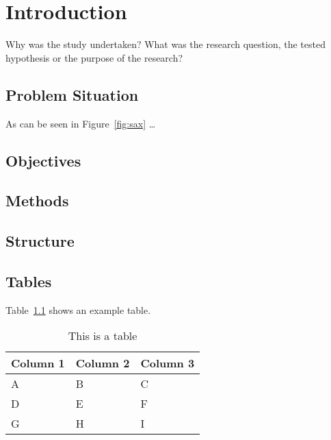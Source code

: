 \chapter{Introduction}

Why was the study undertaken? What was the research question, the tested hypothesis or the purpose of the research?

\blindtext \citet{Shearer2000}

\section{Problem Situation}

\blindtext


As can be seen in Figure~\ref{fig:sax} \ldots

\section{Objectives}

\blindtext

\section{Methods}

\blindtext

\section{Structure}

\blindtext

\section{Tables}

Table~\ref{tab:table-one} shows an example table.

\begin{table}[htbp]
    \centering
    \caption{This is a table}
    \label{tab:table-one}
    \begin{tabular}{lll}
        \addlinespace
        \toprule
        Column 1 & Column 2 & Column 3 \\
        \midrule
        A     & B     & C \\
        D     & E     & F \\
        G     & H     & I \\
        \bottomrule
    \end{tabular}
\end{table}


